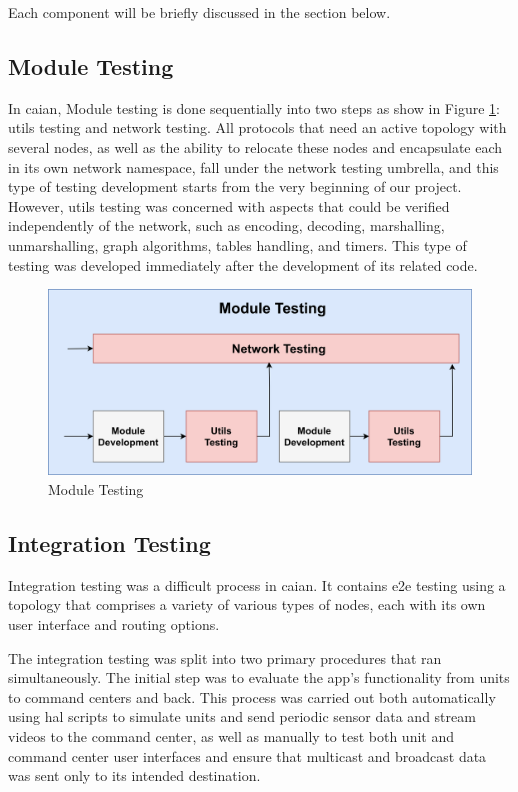 Each component will be briefly discussed in the section below.

\subsection{Module Testing}
In \acrshort{caian}, Module testing is done sequentially into two steps as show in Figure \ref{fig:module-testing}: \acrshort{utils} testing and network testing. All protocols that need an active topology with several nodes, as well as the ability to relocate these nodes and encapsulate each in its own network namespace, fall under the network testing umbrella, and this type of testing development starts from the very beginning of our project. However, \acrshort{utils} testing was concerned with aspects that could be verified independently of the network, such as encoding, decoding, marshalling, unmarshalling, graph algorithms, tables handling, and timers. This type of testing was developed immediately after the development of its related code.

\begin{figure}
    \centering
    \includegraphics[width=15cm]{images/module-testing.png}
    \caption{Module Testing}
    \label{fig:module-testing}
\end{figure}


\subsection{Integration Testing}
Integration testing was a difficult process in \acrshort{caian}. It contains e2e testing using a topology that comprises a variety of various types of nodes, each with its own user interface and routing options.

The integration testing was split into two primary procedures that ran simultaneously. The initial step was to evaluate the app's functionality from units to command centers and back. This process was carried out both automatically using \acrshort{hal} scripts to simulate units and send periodic sensor data and stream videos to the command center, as well as manually to test both unit and command center user interfaces and ensure that multicast and broadcast data was sent only to its intended destination.

